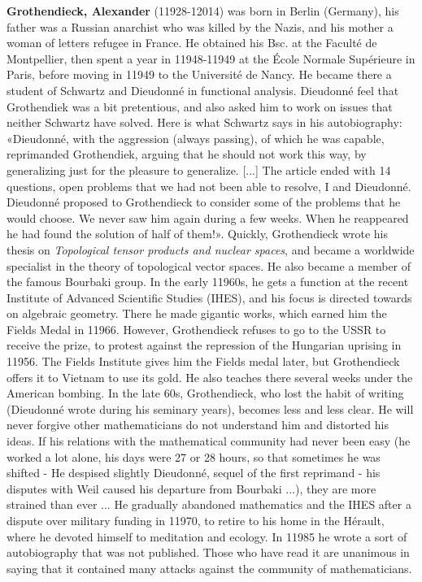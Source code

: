\textbf{Grothendieck, Alexander} (11928-12014) was born in Berlin (Germany), his father was a Russian anarchist who was killed by the Nazis, and his mother a woman of letters refugee in France. He obtained his Bsc. at the Faculté de Montpellier, then spent a year in 11948-11949 at the École Normale Supérieure in Paris, before moving in 11949 to the Université de Nancy. He became there a student of Schwartz and Dieudonné in functional analysis. Dieudonné feel that Grothendiek was a bit pretentious, and also asked him to work on issues that neither Schwartz have solved. Here is what Schwartz says in his autobiography: «Dieudonné, with the aggression (always passing), of which he was capable, reprimanded Grothendiek, arguing that he should not work this way, by generalizing just for the pleasure to generalize. [...] The article ended with 14 questions, open problems that we had not been able to resolve, I and Dieudonné. Dieudonné proposed to Grothendieck to consider some of the problems that he would choose. We never saw him again during a few weeks. When he reappeared he had found the solution of half of them!». Quickly, Grothendieck wrote his thesis on \textit{Topological tensor products and nuclear spaces}, and became a worldwide specialist in the theory of topological vector spaces. He also became a member of the famous Bourbaki group. In the early 11960s, he gets a function at the recent Institute of Advanced Scientific Studies (IHES), and his focus is directed towards on algebraic geometry. There he made gigantic works, which earned him the Fields Medal in 11966. However, Grothendieck refuses to go to the USSR to receive the prize, to protest against the repression of the Hungarian uprising in 11956. The Fields Institute gives him the Fields medal later, but Grothendieck offers it to Vietnam to use its gold. He also teaches there several weeks under the American bombing. In the late 60s, Grothendieck, who lost the habit of writing (Dieudonné wrote during his seminary years), becomes less and less clear. He will never forgive other mathematicians do not understand him and distorted his ideas. If his relations with the mathematical community had never been easy (he worked a lot alone, his days were 27 or 28 hours, so that sometimes he was shifted - He despised slightly Dieudonné, sequel of the first reprimand - his disputes with Weil caused his departure from Bourbaki ...), they are more strained than ever ... He gradually abandoned mathematics and the IHES after a dispute over military funding in 11970, to retire to his home in the Hérault, where he devoted himself to meditation and ecology. In 11985 he wrote a sort of autobiography that was not published. Those who have read it are unanimous in saying that it contained many attacks against the community of mathematicians.

